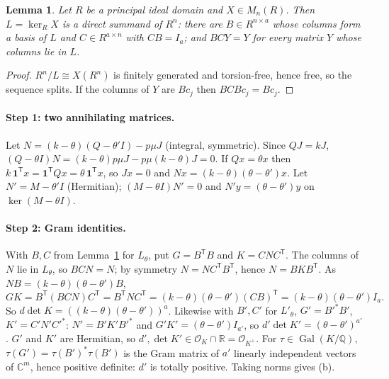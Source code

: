 \documentclass[11pt,a4paper]{article}
\newtheorem{lemma}[theorem]{Lemma}
\theoremstyle{remark}
\newcommand{\Q}{\mathbb{Q}}
\newcommand{\one}{\mathbf{1}}
\newcommand{\OK}{\mathcal{O}_K}
\begin{document}
\begin{lemma}\label{lem:lat}
Let $R$ be a principal ideal domain and $X\in M_n(R)$. Then $L=\ker_R X$ is a direct summand of $R^n$: there are $B\in
R^{n\times a}$ whose columns form a basis of $L$ and $C\in R^{a\times n}$ with $CB=I_a$; and $BCY=Y$ for every matrix $Y$ whose
columns lie in $L$.
\end{lemma}
\begin{proof}
$R^n/L\cong X(R^n)$ is finitely generated and torsion-free, hence free, so the sequence splits. If the columns of $Y$ are
$Bc_j$ then $BCBc_j=Bc_j$.
\end{proof}

\paragraph{Step 1: two annihilating matrices.} Let $N=(k-\theta)(Q-\theta'I)-p\mu J$ (integral, symmetric). Since
$QJ=kJ$, $(Q-\theta I)N=(k-\theta)p\mu J-p\mu(k-\theta)J=0$. If $Qx=\theta x$ then $k\,\one^{\mathsf T}x=\one^{\mathsf T}Qx=\theta\,\one^{\mathsf T}x$,
so $Jx=0$ and $Nx=(k-\theta)(\theta-\theta')x$. Let $N'=M-\theta'I$ (Hermitian); $(M-\theta I)N'=0$ and $N'y=(\theta-\theta')y$
on $\ker(M-\theta I)$.

\paragraph{Step 2: Gram identities.} With $B,C$ from Lemma~\ref{lem:lat} for $L_\theta$, put $G=B^{\mathsf T}B$ and $K=CNC^{\mathsf T}$.
The columns of $N$ lie in $L_\theta$, so $BCN=N$; by symmetry $N=NC^{\mathsf T}B^{\mathsf T}$, hence $N=BKB^{\mathsf T}$. As $NB=(k-\theta)(\theta-\theta')B$,
\[
GK=B^{\mathsf T}(BCN)C^{\mathsf T}=B^{\mathsf T}NC^{\mathsf T}=(k-\theta)(\theta-\theta')(CB)^{\mathsf T}=(k-\theta)(\theta-\theta')I_a .
\]
So $d\det K=((k-\theta)(\theta-\theta'))^a$. Likewise with $B',C'$ for $L'_\theta$, $G'=B'^*B'$, $K'=C'N'C'^*$:
$N'=B'K'B'^*$ and $G'K'=(\theta-\theta')I_{a'}$, so $d'\det K'=(\theta-\theta')^{a'}$. $G'$ and $K'$ are Hermitian, so $d',\det K'\in
\OK\cap\mathbb{R}=\mathcal{O}_{K^+}$. For $\tau\in\operatorname{Gal}(K/\Q)$, $\tau(G')=\tau(B')^*\tau(B')$ is the Gram matrix of $a'$
linearly independent vectors of $\mathbb{C}^m$, hence positive definite: $d'$ is totally positive. Taking norms gives (b).
\end{document}
